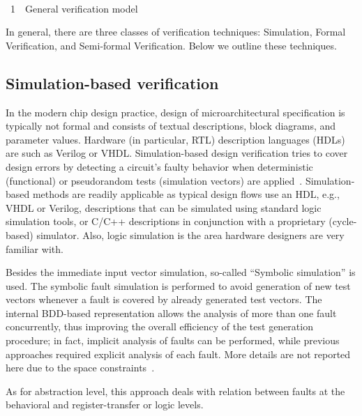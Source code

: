 \begin{multicols}{2}
\vspace*{1pt}
\begin{center}
\mbox{%
\epsfxsize=74.903mm
}
\end{center}
\vspace*{3pt}
\centerline{{\figurename~1}\ \ \small{General verification model}}
\bigskip
\addtocounter{figure}{1}


In general, there are three classes of verification techniques: Simulation, Formal Verification, and Semi-formal
Verification. Below we outline these techniques.

\subsection{Simulation-based verification} %

\noindent
In the modern chip design practice, design of micro\-archi\-tectur\-al specification is typically not formal and
consists of textual descriptions, block diagrams, and pa\-ram\-eter values. Hardware
(in particular, RTL) de\-scrip\-tion languages (HDLs) are such as Verilog or VHDL. Simulation-based design verification
tries to cover design errors by detecting a circuit's faulty behavior when deterministic (functional) or
pseudorandom tests (simulation vectors) are applied~\cite{3bar}. Simulation-based methods are readily applicable as
typical design flows use an HDL, e.g., VHDL or Verilog, descriptions that can be
simulated using standard logic simulation tools, or C/C++ descriptions in conjunction with a proprietary
(cycle-based) simulator. Also, logic simulation is the area hardware designers are very familiar with.

   Besides the immediate input vector simulation, so-called ``Symbolic simulation'' is used. The symbolic fault
simulation is performed to avoid generation of new test vectors whenever a fault is covered by already generated
test vectors. The internal BDD-based representation allows the analysis of more than one fault concurrently,
thus improving the overall efficiency of the test gener\-ation procedure; in fact, implicit analysis of faults can be
performed, while previous approaches required explicit analysis of each fault. More details are not reported here
due to the space constraints~\cite{9bar, 10bar}.

 As for abstraction level, this approach deals with re\-lation between faults at the behavioral
and register-transfer or logic levels.


\end{multicols}
